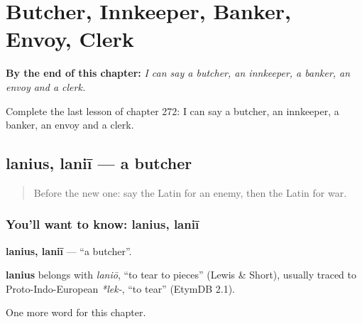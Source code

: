 
\chapter{Butcher, Innkeeper, Banker, Envoy, Clerk}
\label{ch:la-butcher-innkeeper-banker-envoy-clerk}

\begin{chapteropening}
\textbf{By the end of this chapter:} \emph{I can say a butcher, an innkeeper, a banker, an envoy and a clerk.}

Complete the last lesson of chapter 272: I can say a butcher, an innkeeper, a banker, an envoy and a clerk.
\end{chapteropening}

\section[lanius, laniī]{lanius, laniī — a butcher}

\label{lesson:LA-C272-lanius}



\begin{quote}
Before the new one: say the Latin for an enemy, then the Latin for war.
\end{quote}

\subsection*{You'll want to know: lanius, laniī}
\textbf{lanius, laniī} — \textquotedblleft{}a butcher\textquotedblright{}.

\begin{cousinweb}
\textbf{lanius} belongs with \emph{laniō}, \textquotedblleft{}to tear to pieces\textquotedblright{} (Lewis \& Short), usually traced to Proto-Indo-European \emph{*lek-}, \textquotedblleft{}to tear\textquotedblright{} (EtymDB 2.1).
\end{cousinweb}

\begin{grammarlens}[title={What you've built}]
One more word for this chapter.
\end{grammarlens}

